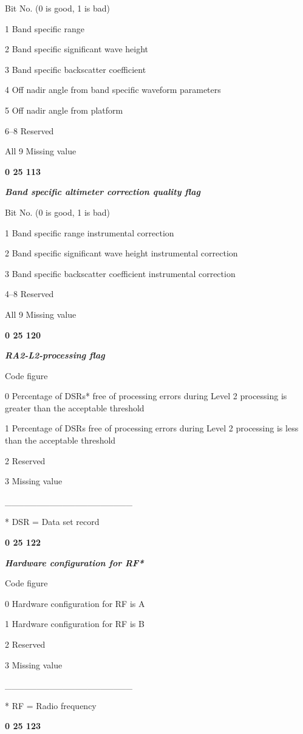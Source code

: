 Bit No. (0 is good, 1 is bad)

1 Band specific range

2 Band specific significant wave height

3 Band specific backscatter coefficient

4 Off nadir angle from band specific waveform parameters

5 Off nadir angle from platform

6--8 Reserved

All 9 Missing value

\textbf{0 25 113}

\emph{\textbf{Band specific altimeter correction quality flag}}

Bit No. (0 is good, 1 is bad)

1 Band specific range instrumental correction

2 Band specific significant wave height instrumental correction

3 Band specific backscatter coefficient instrumental correction

4--8 Reserved

All 9 Missing value

\textbf{0 25 120}

\emph{\textbf{RA2-L2-processing flag}}

Code figure

0 Percentage of DSRs* free of processing errors during Level 2 processing is greater than the acceptable threshold

1 Percentage of DSRs free of processing errors during Level 2 processing is less than the acceptable threshold

2 Reserved

3 Missing value

\_\_\_\_\_\_\_\_\_\_\_\_\_\_\_\_\_\_\_\_

* DSR = Data set record

\textbf{0 25 122}

\emph{\textbf{Hardware configuration for RF*}}

Code figure

0 Hardware configuration for RF is A

1 Hardware configuration for RF is B

2 Reserved

3 Missing value

\_\_\_\_\_\_\_\_\_\_\_\_\_\_\_\_\_\_\_\_

* RF = Radio frequency

\textbf{0 25 123}

